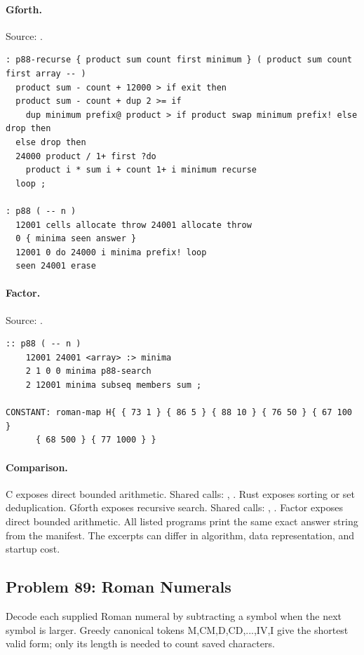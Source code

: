 \paragraph{Gforth.} Source: .
\begin{lstlisting}
: p88-recurse { product sum count first minimum } ( product sum count first array -- )
  product sum - count + 12000 > if exit then
  product sum - count + dup 2 >= if
    dup minimum prefix@ product > if product swap minimum prefix! else drop then
  else drop then
  24000 product / 1+ first ?do
    product i * sum i + count 1+ i minimum recurse
  loop ;

: p88 ( -- n )
  12001 cells allocate throw 24001 allocate throw
  0 { minima seen answer }
  12001 0 do 24000 i minima prefix! loop
  seen 24001 erase
\end{lstlisting}

\paragraph{Factor.} Source: .
\begin{lstlisting}
:: p88 ( -- n )
    12001 24001 <array> :> minima
    2 1 0 0 minima p88-search
    2 12001 minima subseq members sum ;

CONSTANT: roman-map H{ { 73 1 } { 86 5 } { 88 10 } { 76 50 } { 67 100 }
      { 68 500 } { 77 1000 } }
\end{lstlisting}

\paragraph{Comparison.}
C exposes direct bounded arithmetic. Shared calls: \texttt{}, \texttt{}. Rust exposes sorting or set deduplication. Gforth exposes recursive search. Shared calls: \texttt{}, \texttt{}. Factor exposes direct bounded arithmetic.
All listed programs print the same exact answer string from the manifest. The excerpts can differ in algorithm, data representation, and startup cost.

\subsection{Problem 89: Roman Numerals}
\label{walkthrough:p89}
Decode each supplied Roman numeral by subtracting a symbol when the next symbol is larger. Greedy canonical tokens M,CM,D,CD,...,IV,I give the shortest valid form; only its length is needed to count saved characters.

